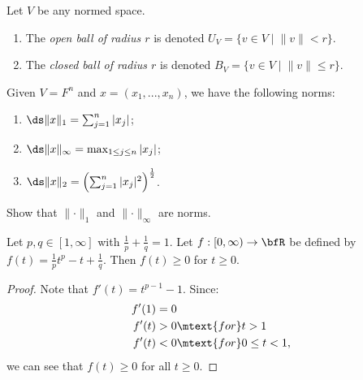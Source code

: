     \begin{definition}
        Let $V$ be any normed space.
            \begin{enumerate}[label = (\arabic*)]
                \item The \textit{open ball of radius $r$} is denoted $U_V = \{v \in V \mid \lVert v \rVert < r\}$.
                \item The \textit{closed ball of radius $r$} is denoted $B_V = \{v \in V \mid \lVert v \rVert \leq r\}$.
            \end{enumerate}
    \end{definition}

    \begin{example}
        Given $V = F^n$ and $x = (x_1,...,x_n)$, we have the following norms:
            \begin{enumerate}[label = (\arabic*)]
                \item $\ds \lVert x \rVert _1 = \sum_{j = 1}^n |x_j|$;
                \item $\ds \lVert x \rVert _\infty = \max_{1 \leq j \leq n}|x_j|$;
                \item $\ds \lVert x \rVert _2 = \left(\sum_{j = 1}^n |x_j|^2\right)^\frac{1}{2}$.
            \end{enumerate}
    \end{example}

    \begin{exercise}\label{ex:1-infty-norm}
        Show that $\lVert \cdot \rVert _1$ and $\lVert \cdot \rVert _\infty$ are norms.
    \end{exercise}

    \begin{lemma}\label{lemma:lemnorm1}
        Let $p,q \in [1,\infty]$ with $\frac{1}{p} + \frac{1}{q} = 1$. Let $f:[0,\infty) \rightarrow \bfR$ be defined by $f(t) = \frac{1}{p}t^p - t + \frac{1}{q}$. Then $f(t) \geq 0$ for $t \geq 0$.
    \end{lemma}
        \begin{proof}
            Note that $f'(t) = t^{p-1} - 1$. Since:
                \begin{equation*}
                \begin{split}
                    f'(1) &= 0 \\
                    f'(t) &> 0 \mtext{for} t>1 \\
                    f'(t) &<0 \mtext{for} 0\leq t < 1,
                \end{split}
                \end{equation*}
            we can see that $f(t) \geq 0$ for all $t \geq 0$.
        \end{proof}


